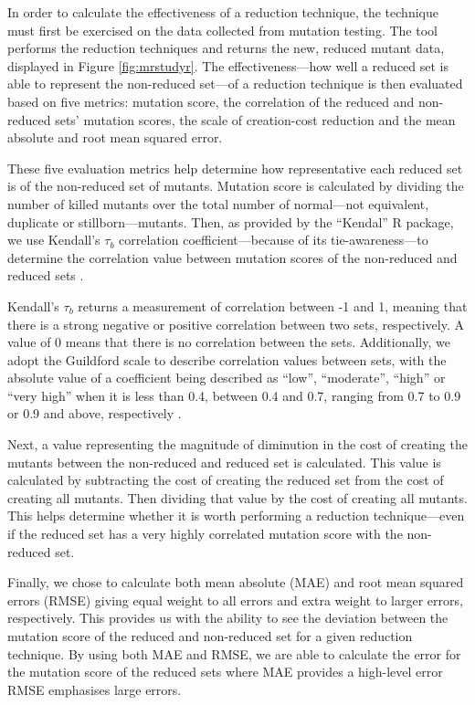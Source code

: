 In order to calculate the effectiveness of a reduction technique, the technique
must first be exercised on the data collected from mutation testing. The \mr tool
performs the reduction techniques and returns the new, reduced mutant data,
displayed in Figure \ref{fig:mrstudyr}. The effectiveness---how well a reduced set is able to represent
the non-reduced set---of a reduction technique is then evaluated
based on five metrics: mutation score, the correlation of the reduced and non-reduced sets' mutation scores,
the scale of creation-cost reduction and the mean absolute and root mean squared error.

These five evaluation metrics help determine how representative each reduced
set is of the non-reduced set of mutants. Mutation score is calculated
by dividing the number of killed mutants over the total number of normal---not
equivalent, duplicate or stillborn---mutants. Then, as provided by the ``Kendal'' R package,
we use Kendall's $\tau_b$ correlation coefficient---because of its tie-awareness---to
determine the correlation value between mutation scores of the non-reduced and reduced sets \cite{mcleod2005kendall}.

Kendall's $\tau_b$ returns a measurement of correlation between -1 and 1, meaning that
there is a strong negative or positive correlation between two sets, respectively. A value
of 0 means that there is no correlation between the sets. Additionally, we adopt the
Guildford scale to describe correlation values between sets, with the absolute value
of a coefficient being described as ``low'', ``moderate'', ``high'' or ``very high'' when
it is less than 0.4, between 0.4 and 0.7, ranging from 0.7 to 0.9 or 0.9 and above, respectively \cite{inozemtseva2014coverage}.

Next, a value representing the magnitude of diminution in the cost of creating the mutants between the non-reduced
and reduced set is calculated. This value is calculated by subtracting
the cost of creating the reduced set from the cost of creating all mutants. Then
dividing that value by the cost of creating all mutants. This helps
determine whether it is worth performing a reduction technique---even if the
reduced set has a very highly correlated mutation score with the non-reduced set.

Finally, we chose to calculate both mean absolute (MAE) and root mean squared errors (RMSE) giving equal weight to
all errors and extra weight to larger errors, respectively. This provides
us with the ability to see the deviation between the mutation score of the reduced and
non-reduced set for a given reduction technique. By using both MAE and RMSE,
we are able to calculate the error for the mutation score of the reduced sets
where MAE provides a high-level error RMSE emphasises large errors.

